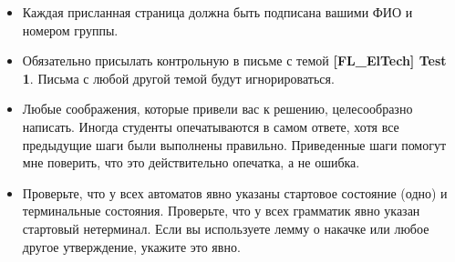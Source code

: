 \documentclass[12pt]{article}
\begin{document}
\begin{itemize}
  \item Каждая присланная страница должна быть подписана вашими ФИО и номером группы.
  \item Обязательно присылать контрольную в письме с темой \textbf{[FL\_ElTech] Test 1}. Письма с любой другой темой будут игнорироваться.
  \item Любые соображения, которые привели вас к решению, целесообразно написать. Иногда студенты опечатываются в самом ответе, хотя все предыдущие шаги были выполнены правильно. Приведенные шаги помогут мне поверить, что это действительно опечатка, а не ошибка.
  \item Проверьте, что у всех автоматов явно указаны стартовое состояние (одно) и терминальные состояния. Проверьте, что у всех грамматик явно указан стартовый нетерминал. Если вы используете лемму о накачке или любое другое утверждение, укажите это явно.
\end{itemize}
\end{document}
